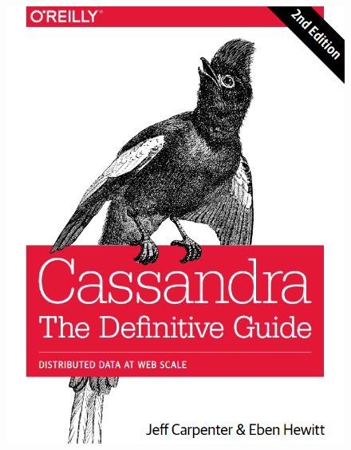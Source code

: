 \begin{frame}
\begin{figure}[ht]
\begin{minipage}[c][1\width]{
				0.3\textwidth}
			\includegraphics[width=\linewidth]{./Figures/chapter-00/cassandra.png}
		\end{minipage}
		\hfill
		\begin{minipage}[c][1\width]{
				0.3\textwidth}
			\centering

\end{minipage}
\end{figure}
\end{frame}
